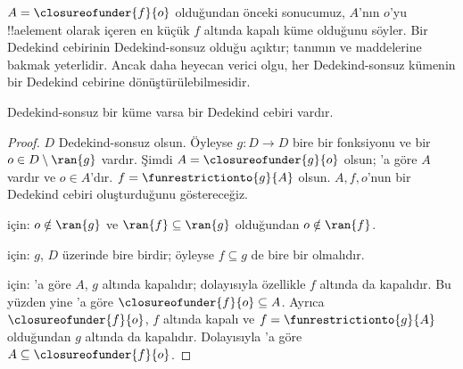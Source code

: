\documentclass[../../../include/open-logic-section]{subfiles}
\begin{document}
$A=\closureofunder{f}{o}$ olduğundan önceki sonucumuz, $A$'nın $o$'yu
!!a{element} olarak içeren en küçük $f$ altında kapalı küme olduğunu söyler.
Bir Dedekind cebirinin Dedekind-sonsuz olduğu açıktır; tanımın
 ve  maddelerine bakmak yeterlidir.
Ancak daha heyecan verici olgu, her Dedekind-sonsuz kümenin bir Dedekind
cebirine dönüştürülebilmesidir.

\begin{thm}
Dedekind-sonsuz bir küme varsa bir Dedekind cebiri vardır.
\end{thm}

\begin{proof}
$D$ Dedekind-sonsuz olsun. Öyleyse $g\colon D\to D$ bire bir fonksiyonu ve
bir $o\in D\setminus\ran{g}$ vardır. Şimdi
$A=\closureofunder{g}{o}$ olsun; 'a göre $A$
vardır ve $o\in A$'dır. $f=\funrestrictionto{g}{A}$ olsun. $A,f,o$'nun bir
Dedekind cebiri oluşturduğunu göstereceğiz.

 için: $o\notin\ran{g}$ ve $\ran{f}\subseteq\ran{g}$
olduğundan $o\notin\ran{f}$.

 için: $g$, $D$ üzerinde bire birdir; öyleyse
$f\subseteq g$ de bire bir olmalıdır.

 için: 'a göre $A$, $g$ altında
kapalıdır; dolayısıyla özellikle $f$ altında da kapalıdır. Bu yüzden yine
'a göre $\closureofunder{f}{o}\subseteq A$.
Ayrıca $\closureofunder{f}{o}$, $f$ altında kapalı ve
$f=\funrestrictionto{g}{A}$ olduğundan $g$ altında da kapalıdır. Dolayısıyla
'a göre
$A\subseteq\closureofunder{f}{o}$.
\end{proof}
\end{document}
